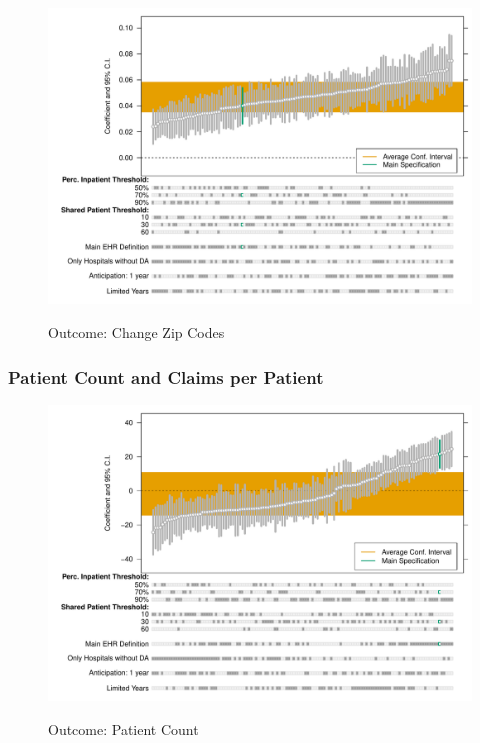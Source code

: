 \documentclass[12pt]{article}
\begin{document}
\begin{figure}[ht]
    \centering
    \caption{Outcome: Change Zip Codes}
    \includegraphics[scale=.6]{Objects/change_zip_chart.pdf}
    \label{fig:zip_chart}
\end{figure}




\subsubsection{Patient Count and Claims per Patient}

\begin{figure}[ht]
    \centering
    \caption{Outcome: Patient Count}
    \includegraphics[scale=.6]{Objects/patientcount_chart.pdf}
    \label{fig:pat_chart}
\end{figure}
\end{document}
